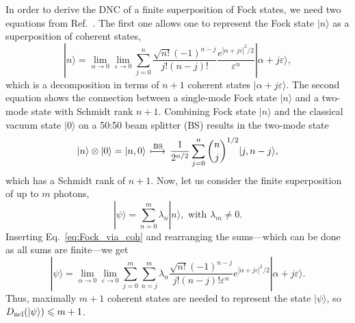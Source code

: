 \documentclass[aps,pra,twocolumn,showpacs,superscriptaddress,10pt]{revtex4-1}
\begin{document}
	In order to derive the DNC of a finite superposition of Fock states, we need two equations from Ref.~\cite{Vogel2014}.
	The first one allows one to represent the Fock state $|n\rangle$ as a superposition of coherent states,
	\begin{equation}
		|n\rangle=\lim\limits_{\alpha\to 0}\lim\limits_{\varepsilon\to 0}\sum_{j=0}^n \frac{\sqrt{n!}(-1)^{n-j}}{j!(n-j)!}\frac{e^{|\alpha+j\varepsilon|^2/2}}{\varepsilon^{n}}|\alpha+j\varepsilon\rangle,\label{eq:Fock_via_coh}
	\end{equation}
	which is a decomposition in terms of $n+1$ coherent states $|\alpha+j\varepsilon\rangle$.
	The second equation shows the connection between a single-mode Fock state $|n\rangle$ and a two-mode state with Schmidt rank $n+1$.
	Combining Fock state $|n\rangle$ and the classical vacuum state $|0\rangle$ on a 50:50 beam splitter (BS) results in the two-mode state
	\begin{equation}
		|n\rangle\otimes|0\rangle=|n,0\rangle\,\stackrel{\rm BS}{\longmapsto}\, \frac{1}{2^{n/2}}\sum_{j=0}^n \binom{n}{j}^{1/2} |j,n-j\rangle,
	\end{equation}
	which has a Schmidt rank of $n+1$.
	Now, let us consider the finite superposition of up to $m$ photons,
	\begin{equation}\label{eq:sup_Fock}
		|\psi\rangle=\sum\limits_{n=0}^{m}\lambda_n|n\rangle, \text{~with }\lambda_m\neq0.
	\end{equation}
	Inserting Eq.~\eqref{eq:Fock_via_coh} and rearranging the sums---which can be done as all sums are finite---we get
	\begin{equation}\label{eq:genFockBS}
		|\psi\rangle=\lim\limits_{\alpha\to 0}\lim\limits_{\varepsilon\to 0}\sum\limits_{j=0}^{m}\sum\limits_{n=j}^{m}\lambda_{n}\frac{\sqrt{n!}(-1)^{n-j}}{j!(n-j)!\varepsilon^n}e^{|\alpha+j\varepsilon|^2/2}|\alpha+j\varepsilon\rangle.
	\end{equation}
	Thus, maximally $m+1$ coherent states are needed to represent the state $|\psi\rangle$, so $D_{\rm ncl}(|\psi\rangle)\leqslant m+1$.
\end{document}
